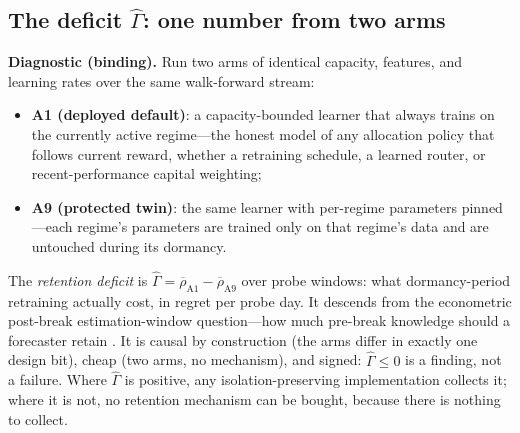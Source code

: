 \documentclass[sigconf,anonymous]{acmart}
\newcommand{\G}{\hat\Gamma}
\newcommand{\regret}{\rho}
\begin{document}
\subsection{The deficit \texorpdfstring{$\G$}{Gamma}: one number from two
arms}
\label{sec:gamma}

\textbf{Diagnostic (binding).} Run two arms of identical capacity,
features, and learning rates over the same walk-forward stream:
\begin{itemize}
  \item \textbf{A1 (deployed default)}: a capacity-bounded learner that
  always trains on the currently active regime---the honest model of any
  allocation policy that follows current reward, whether a retraining
  schedule, a learned router, or recent-performance capital weighting;
  \item \textbf{A9 (protected twin)}: the same learner with per-regime
  parameters pinned---each regime's parameters are trained only on that
  regime's data and are untouched during its dormancy.
\end{itemize}
The \emph{retention deficit} is
$\G = \overline{\regret}_{\text{A1}} - \overline{\regret}_{\text{A9}}$
over probe windows: what dormancy-period retraining actually cost, in
regret per probe day. It descends from the econometric
post-break estimation-window question---how much pre-break knowledge
should a forecaster retain \cite{pesaran2007selection}. It is causal by
construction (the arms differ in exactly one design bit), cheap (two
arms, no mechanism), and signed: $\G \le 0$ is a finding, not a failure.
Where $\G$ is positive, any isolation-preserving implementation
collects it;
where it is not, no retention mechanism can be bought, because there is
nothing to collect.
\end{document}
